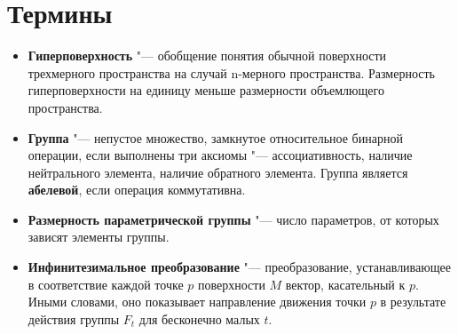 \documentclass[a4paper,14pt]{extarticle}
\begin{document}
\clearpage
{}{}
\appendix
\section{Термины}
\begin{itemize}
\item \textbf{Гиперповерхность} "--- обобщение понятия обычной поверхности трехмерного пространства на случай n-мерного пространства. Размерность гиперповерхности на единицу меньше размерности объемлющего пространства.

\item \textbf{Группа} "--- непустое множество, замкнутое относительное бинарной операции, если выполнены три аксиомы "--- ассоциативность, наличие нейтрального элемента, наличие обратного элемента. Группа является \textbf{абелевой}, если операция коммутативна.

\item \textbf{Размерность параметрической группы} "--- число параметров, от которых зависят элементы группы.

\item \textbf{Инфинитезимальное преобразование} "--- преобразование, устанавливающее в соответствие каждой точке $p$ поверхности $M$ вектор, касательный к $p$. Иными словами, оно показывает направление движения точки $p$ в результате действия группы $F_t$ для бесконечно малых $t$.

\end{itemize}
\end{document}
